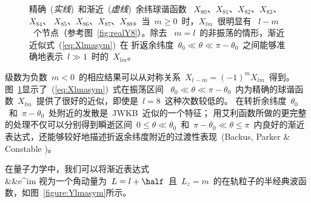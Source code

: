 \begin{figure}
\begin{center}
{}
\end{center}
\caption[Asymp Xlm]{\label{figure:asymXlm}
精确~({\em 实线\/})~和渐近~({\em 虚线\/})~余纬球谐函数~ $X_{80}$、$X_{81}$、$X_{82}$、$X_{83}$、$X_{84}$、
$X_{85}$、$X_{86}$、$X_{87}$、$X_{88}$。当~$m\geq 0$~时，$X_{lm}$~很明显有~ $l-m$~个节点（参考图~\ref{fig:realY8}）。除去~
$m=l$~的非振荡的情形，渐近近似式~(\ref{eq:Xlmasym})~在
折返余纬度~$\theta_0\ll
\theta\ll\pi-\theta_0$~之间能够准确地表示~$l\gg 1$~时的~$X_{lm}$。}
\end{figure}
级数为负数~$m<0$~的相应结果可以从对称关系~$X_{l\,-m}=(-1)^mX_{lm}$~得到。
图~\ref{figure:asymXlm}显示了~(\ref{eq:Xlmasym})~式在振荡区间~ $\theta_0\ll\theta\ll\pi-\theta_0$~内为精确的球谐函数~$X_{lm}$~提供了很好的近似，即使是~$l=8$~这种次数较低的。
在转折余纬度~$\theta_0$~和~$\pi-\theta_0$~处附近的发散是~JWKB~近似的一个特征；
用艾利函数所做的更完整的处理不仅可以分别得到瞬逝区间~$0\leq\theta\ll\theta_0$~和~$\pi-\theta_0\ll\theta\leq\pi$~内良好的渐近表达式，还能够较好地描述折返余纬度附近的过渡性表现~(Backus, Parker \& Constable \citeyear{backus&al96})。
 
在量子力学中，我们可以将渐近表达式
\eqa \label{eq:Ylmasym} 
\nonumber \\
&&\mbox{}\times\cos{}e^{im\phi}\frac{}{}
\ena
视为一个角动量为~$L=l+\half$~且~$L_z=m$~的在轨粒子的半经典波函数，如图~\ref{figure:Ylmasym}所示。

